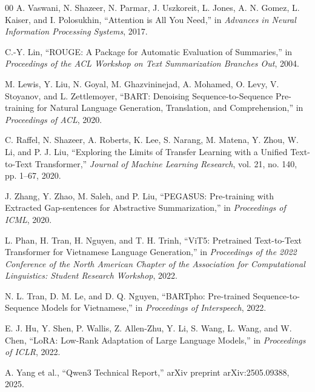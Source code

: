 \documentclass[conference]{IEEEtran}
\begin{document}
\begin{thebibliography}{00}
A. Vaswani, N. Shazeer, N. Parmar, J. Uszkoreit, L. Jones, A. N. Gomez, L. Kaiser, and I. Polosukhin, ``Attention is All You Need,'' in \textit{Advances in Neural Information Processing Systems}, 2017.

C.-Y. Lin, ``ROUGE: A Package for Automatic Evaluation of Summaries,'' in \textit{Proceedings of the ACL Workshop on Text Summarization Branches Out}, 2004.

M. Lewis, Y. Liu, N. Goyal, M. Ghazvininejad, A. Mohamed, O. Levy, V. Stoyanov, and L. Zettlemoyer, ``BART: Denoising Sequence-to-Sequence Pre-training for Natural Language Generation, Translation, and Comprehension,'' in \textit{Proceedings of ACL}, 2020.

C. Raffel, N. Shazeer, A. Roberts, K. Lee, S. Narang, M. Matena, Y. Zhou, W. Li, and P. J. Liu, ``Exploring the Limits of Transfer Learning with a Unified Text-to-Text Transformer,'' \textit{Journal of Machine Learning Research}, vol. 21, no. 140, pp. 1--67, 2020.

J. Zhang, Y. Zhao, M. Saleh, and P. Liu, ``PEGASUS: Pre-training with Extracted Gap-sentences for Abstractive Summarization,'' in \textit{Proceedings of ICML}, 2020.

L. Phan, H. Tran, H. Nguyen, and T. H. Trinh, ``ViT5: Pretrained Text-to-Text Transformer for Vietnamese Language Generation,'' in \textit{Proceedings of the 2022 Conference of the North American Chapter of the Association for Computational Linguistics: Student Research Workshop}, 2022.

N. L. Tran, D. M. Le, and D. Q. Nguyen, ``BARTpho: Pre-trained Sequence-to-Sequence Models for Vietnamese,'' in \textit{Proceedings of Interspeech}, 2022.

E. J. Hu, Y. Shen, P. Wallis, Z. Allen-Zhu, Y. Li, S. Wang, L. Wang, and W. Chen, ``LoRA: Low-Rank Adaptation of Large Language Models,'' in \textit{Proceedings of ICLR}, 2022.

A. Yang et al., ``Qwen3 Technical Report,'' arXiv preprint arXiv:2505.09388, 2025.
\end{thebibliography}

\balance
\end{document}
